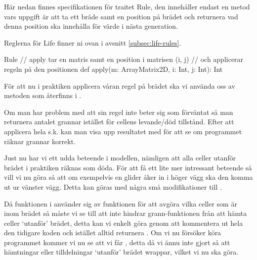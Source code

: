         Här nedan finnes specifikationen för traitet Rule, den innehåller endast en metod  vars uppgift är att ta ett bräde samt en position på brädet och returnera vad denna position ska innehålla för värde i nästa generation.
        
        Reglerna för Life finner ni ovan i avsnitt \ref{subsec:life-rules}.

\begin{ScalaSpec}{Rule}
// apply tar en matris samt en position i matrisen (i, j)
// och applicerar regeln på den positionen
def apply(m: ArrayMatrix2D, i: Int, j: Int): Int
\end{ScalaSpec}

        
        För att nu i praktiken applicera våran regel på brädet ska vi använda oss av metoden  som återfinns i .

        Om man har problem med att sin regel inte beter sig som förväntat så man returnera antalet grannar istället för cellens levande/död tillstånd. Efter att applicera hela s.k.  kan man visa upp resultatet med  för att se om programmet räknar grannar korrekt.


    
    Just nu har vi ett udda beteende i modellen, nämligen att alla celler utanför brädet i praktiken räknas som döda. För att få ett lite mer intressant beteende så vill vi nu göra så att om exempelvis en glider åker in i höger vägg ska den komma ut ur vänster vägg. Detta kan göras med några små modifikationer till .


        Då funktionen  i  använder sig av funktionen  för att avgöra vilka celler som är inom brädet så måste vi se till att  inte hindrar grann-funktionen från att hämta celler `utanför' brädet, detta kan vi enkelt göra genom att kommentera ut hela den tidigare koden och istället alltid returnera . Om vi nu försöker köra programmet kommer vi nu se att vi får , detta då vi ännu inte gjort så att hämtningar eller tilldelningar `utanför' brädet wrappar, vilket vi nu ska göra.

